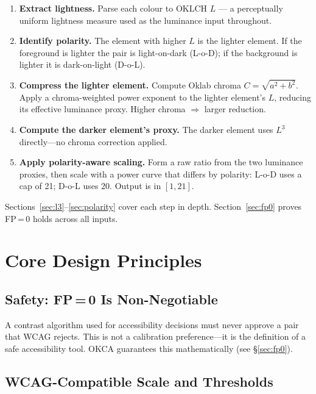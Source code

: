 \documentclass[11pt,a4paper]{article}
\begin{document}
\begin{enumerate}
  \item \textbf{Extract lightness.}  Parse each colour to OKLCH $L$ ---
    a perceptually uniform lightness measure used as the luminance input
    throughout.
  \item \textbf{Identify polarity.}  The element with higher $L$ is the
    lighter element.  If the foreground is lighter the pair is
    light-on-dark (L-o-D); if the background is lighter it is
    dark-on-light (D-o-L).
  \item \textbf{Compress the lighter element.}  Compute Oklab chroma
    $C = \sqrt{a^2+b^2}$.  Apply a chroma-weighted power exponent to
    the lighter element's $L$, reducing its effective luminance proxy.
    Higher chroma $\Rightarrow$ larger reduction.
  \item \textbf{Compute the darker element's proxy.}  The darker element
    uses $L^3$ directly---no chroma correction applied.
  \item \textbf{Apply polarity-aware scaling.}  Form a raw ratio from
    the two luminance proxies, then scale with a power curve that
    differs by polarity: L-o-D uses a cap of 21; D-o-L uses 20.
    Output is in $[1, 21]$.
\end{enumerate}

Sections~\ref{sec:l3}--\ref{sec:polarity} cover each step in depth.
Section~\ref{sec:fp0} proves FP\,=\,0 holds across all inputs.

\section{Core Design Principles}

\subsection{\texorpdfstring{Safety: FP\,=\,0 Is Non-Negotiable}{Safety: FP = 0 Is Non-Negotiable}}

A contrast algorithm used for accessibility decisions must never approve
a pair that WCAG rejects.  This is not a calibration preference---it is
the definition of a safe accessibility tool.  OKCA guarantees this
mathematically (see \S\ref{sec:fp0}).

\subsection{WCAG-Compatible Scale and Thresholds}
\end{document}
